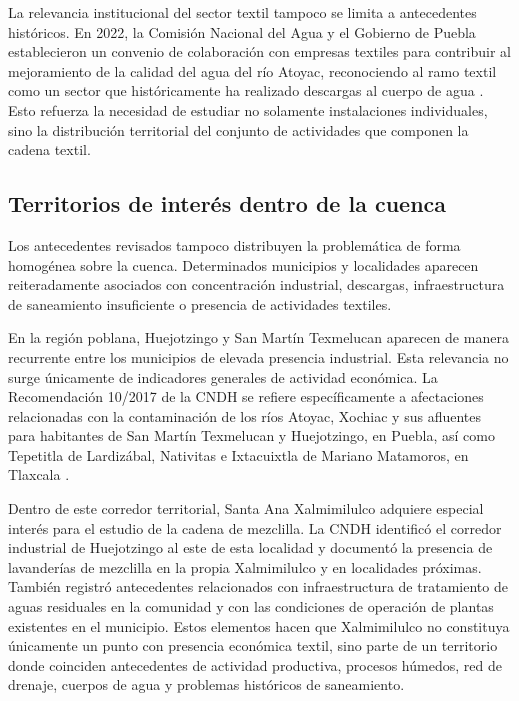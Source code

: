 \documentclass[11pt,letterpaper]{article}
\begin{document}
La relevancia institucional del sector textil tampoco se limita a antecedentes históricos. En 2022, la Comisión Nacional del Agua y el Gobierno de Puebla establecieron un convenio de colaboración con empresas textiles para contribuir al mejoramiento de la calidad del agua del río Atoyac, reconociendo al ramo textil como un sector que históricamente ha realizado descargas al cuerpo de agua \cite{conagua2022textil}. Esto refuerza la necesidad de estudiar no solamente instalaciones individuales, sino la distribución territorial del conjunto de actividades que componen la cadena textil.

\subsection{Territorios de interés dentro de la cuenca}

Los antecedentes revisados tampoco distribuyen la problemática de forma homogénea sobre la cuenca. Determinados municipios y localidades aparecen reiteradamente asociados con concentración industrial, descargas, infraestructura de saneamiento insuficiente o presencia de actividades textiles.

En la región poblana, Huejotzingo y San Martín Texmelucan aparecen de manera recurrente entre los municipios de elevada presencia industrial. Esta relevancia no surge únicamente de indicadores generales de actividad económica. La Recomendación 10/2017 de la CNDH se refiere específicamente a afectaciones relacionadas con la contaminación de los ríos Atoyac, Xochiac y sus afluentes para habitantes de San Martín Texmelucan y Huejotzingo, en Puebla, así como Tepetitla de Lardizábal, Nativitas e Ixtacuixtla de Mariano Matamoros, en Tlaxcala \cite{cndh2017atoyac}.

Dentro de este corredor territorial, Santa Ana Xalmimilulco adquiere especial interés para el estudio de la cadena de mezclilla. La CNDH identificó el corredor industrial de Huejotzingo al este de esta localidad y documentó la presencia de lavanderías de mezclilla en la propia Xalmimilulco y en localidades próximas. También registró antecedentes relacionados con infraestructura de tratamiento de aguas residuales en la comunidad y con las condiciones de operación de plantas existentes en el municipio. Estos elementos hacen que Xalmimilulco no constituya únicamente un punto con presencia económica textil, sino parte de un territorio donde coinciden antecedentes de actividad productiva, procesos húmedos, red de drenaje, cuerpos de agua y problemas históricos de saneamiento.
\end{document}
